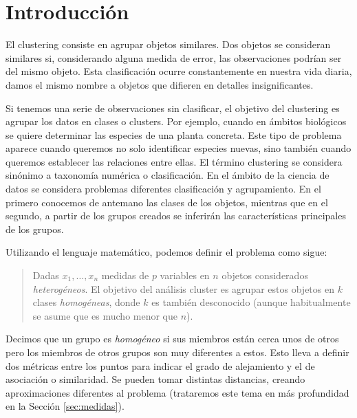 \documentclass[a4paper, 20pt]{article}
\begin{document}
{\parskip=2pt
  \tableofcontents
}
\pagebreak

\section{Introducción}

El clustering consiste en agrupar objetos similares. Dos objetos se consideran similares si, considerando alguna medida de error, las observaciones podrían ser del mismo objeto. Esta clasificación ocurre constantemente en nuestra vida diaria, damos el mismo nombre a objetos que difieren en detalles insignificantes. 


Si tenemos una serie de observaciones sin clasificar, el objetivo del clustering es agrupar los datos en clases o clusters. Por ejemplo, cuando en ámbitos biológicos se quiere determinar las especies de una planta concreta. Este tipo de problema aparece cuando queremos no solo identificar especies nuevas, sino también cuando queremos establecer las relaciones entre ellas. El término clustering se considera sinónimo a taxonomía numérica o clasificación. En el ámbito de la ciencia de datos se considera problemas diferentes clasificación y agrupamiento. En el primero conocemos de antemano las clases de los objetos, mientras que en el segundo, a partir de los grupos creados se inferirán las características principales de los grupos.

Utilizando el lenguaje matemático, podemos definir el problema como sigue:

\begin{quote}
  Dadas \textbf{$x_1$}$,\dots, $\textbf{$x_n$} medidas de $p$ variables en $n$ objetos considerados \textit{heterogéneos}. El objetivo del análisis cluster es agrupar estos objetos en $k$ clases \textit{homogéneas}, donde $k$ es también desconocido (aunque habitualmente se asume que es mucho menor que $n$).
\end{quote}

Decimos que un grupo es \textit{homogéneo} si sus miembros están cerca unos de otros pero los miembros de otros grupos son muy diferentes a estos. Esto lleva a definir dos métricas entre los puntos para indicar el grado de alejamiento y el de asociación o similaridad. Se pueden tomar distintas distancias, creando aproximaciones diferentes al problema (trataremos este tema en más profundidad en la Sección \ref{sec:medidas}).
\end{document}
